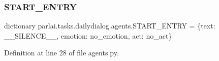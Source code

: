 \subsubsection{\texorpdfstring{S\+T\+A\+R\+T\+\_\+\+E\+N\+T\+RY}{START\_ENTRY}}
{\footnotesize\ttfamily dictionary parlai.\+tasks.\+dailydialog.\+agents.\+S\+T\+A\+R\+T\+\_\+\+E\+N\+T\+RY = \{\textquotesingle{}text\textquotesingle{}\+: \textquotesingle{}\+\_\+\+\_\+\+S\+I\+L\+E\+N\+C\+E\+\_\+\+\_\+\textquotesingle{}, \textquotesingle{}emotion\textquotesingle{}\+: \textquotesingle{}no\+\_\+emotion\textquotesingle{}, \textquotesingle{}act\textquotesingle{}\+: \textquotesingle{}no\+\_\+act\textquotesingle{}\}}



Definition at line 28 of file agents.\+py.

